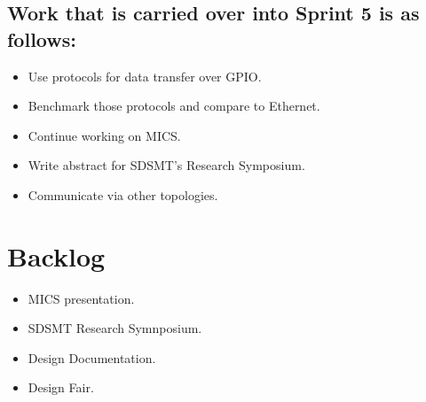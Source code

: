 \documentclass{article}
\begin{document}
\subsection*{Work that is carried over into Sprint 5 is as follows:}
\begin{itemize}
	\item Use protocols for data transfer over GPIO.
	\item Benchmark those protocols and compare to Ethernet.
	\item Continue working on MICS.
	\item Write abstract for SDSMT's Research Symposium.
	\item Communicate via other topologies.
\end{itemize}

\section*{Backlog}
\begin{itemize}
	\item MICS presentation.
	\item SDSMT Research Symnposium. 
	\item Design Documentation.
	\item Design Fair.
\end{itemize}
\end{document}
